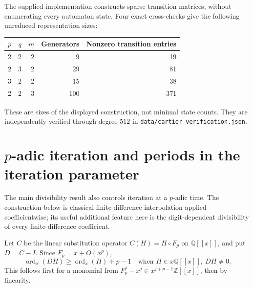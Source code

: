 \documentclass[11pt]{article}
\theoremstyle{definition}
\theoremstyle{remark}
\newcommand{\Z}{\mathbb Z}
\newcommand{\Q}{\mathbb Q}
\DeclareMathOperator{\ord}{ord}
\begin{document}
The supplied implementation constructs sparse transition matrices,
without enumerating every automaton state. Four exact cross-checks
give the following unreduced representation sizes:
\begin{center}
\begin{tabular}{@{}rrrrr@{}}
\toprule
$p$ & $q$ & $m$ & Generators & Nonzero transition entries\\
\midrule
2&2&2&9&19\\
2&3&2&29&81\\
3&2&2&15&38\\
2&2&3&100&371\\
\bottomrule
\end{tabular}
\end{center}
These are sizes of the displayed construction, not minimal state
counts. They are independently verified through degree $512$ in
\texttt{data/cartier\_verification.json}.

\section{\texorpdfstring{$p$}{p}-adic iteration and periods in the iteration parameter}
\label{lim:dsd:sec:padic}

The main divisibility result also controls iteration at a $p$-adic
time. The construction below is classical finite-difference
interpolation applied coefficientwise; its useful additional
feature here is the digit-dependent divisibility of every
finite-difference coefficient.

Let $C$ be the linear substitution operator $C(H)=H\circ F_p$
on $\Q[[x]]$, and put $D=C-I$. Since $F_p=x+O(x^p)$,
\begin{equation}
 \ord_x(DH)\ge\ord_x(H)+p-1
 \quad\text{when }H\in x\Q[[x]],\ DH\ne0.
 \label{lim:dsd:eq:order-increase}
\end{equation}
This follows first for a monomial from
$F_p^j-x^j\in x^{j+p-1}\Z[[x]]$, then by linearity.
\end{document}
